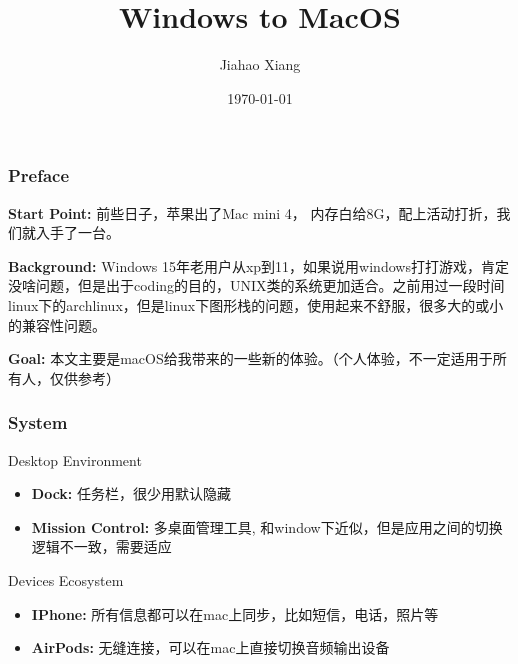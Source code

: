 \documentclass{beamer}
\title{\textbf{Windows to MacOS}}
\author[xjh]{Jiahao Xiang}
\date{\today}
\begin{document}
\begin{frame}
    \titlepage
\end{frame}

\begin{frame}
    \frametitle{Preface}
    
   \textbf{Start Point:} 前些日子，苹果出了Mac mini 4， 内存白给8G，配上活动打折，我们就入手了一台。 
   \vfill
    
   \textbf{Background:} Windows 15年老用户从xp到11，如果说用windows打打游戏，肯定没啥问题，但是出于coding的目的，UNIX类的系统更加适合。之前用过一段时间linux下的archlinux，但是linux下图形栈的问题，使用起来不舒服，很多大的或小的兼容性问题。

   \vfill
    \textbf{Goal:} 本文主要是macOS给我带来的一些新的体验。（个人体验，不一定适用于所有人，仅供参考）

\end{frame}


\begin{frame}
    \frametitle{System}
    \begin{block}{Desktop Environment}
        \begin{itemize}
            \item \textbf{Dock:} 任务栏，很少用默认隐藏
            \item \textbf{Mission Control:} 多桌面管理工具, 和window下近似，但是应用之间的切换逻辑不一致，需要适应
        \end{itemize}
    \end{block}
    \begin{block}{Devices Ecosystem}
        \begin{itemize}
            \item \textbf{IPhone:} 所有信息都可以在mac上同步，比如短信，电话，照片等
            \item \textbf{AirPods:} 无缝连接，可以在mac上直接切换音频输出设备  
        \end{itemize}
    \end{block}
\end{frame}
\end{document}

